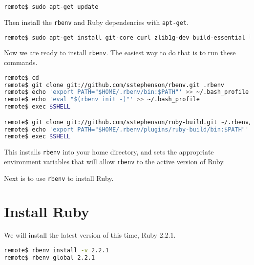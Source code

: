 \begin{minipage}{\linewidth}
\begin{lstlisting}[language=bash]
remote$ sudo apt-get update
\end{lstlisting}
\end{minipage}

Then install the \texttt{rbenv} and Ruby dependencies with \texttt{apt-get}.

\begin{minipage}{\linewidth}
\begin{lstlisting}[language=bash]
remote$ sudo apt-get install git-core curl zlib1g-dev build-essential libssl-dev libreadline-dev libyaml-dev libsqlite3-dev sqlite3 libxml2-dev libxslt1-dev libcurl4-openssl-dev python-software-properties libffi-dev
\end{lstlisting}
\end{minipage}

Now we are ready to install \texttt{rbenv}. The easiest way to do that is to run
these commands.

\begin{minipage}{\linewidth}
\begin{lstlisting}[language=bash]
remote$ cd
remote$ git clone git://github.com/sstephenson/rbenv.git .rbenv
remote$ echo 'export PATH="$HOME/.rbenv/bin:$PATH"' >> ~/.bash_profile
remote$ echo 'eval "$(rbenv init -)"' >> ~/.bash_profile
remote$ exec $SHELL

remote$ git clone git://github.com/sstephenson/ruby-build.git ~/.rbenv/plugins/ruby-build
remote$ echo 'export PATH="$HOME/.rbenv/plugins/ruby-build/bin:$PATH"' >> ~/.bash_profile
remote$ exec $SHELL
\end{lstlisting}
\end{minipage}

This installs \texttt{rbenv} into your home directory, and sets the appropriate
environment variables that will allow \texttt{rbenv} to the active version of Ruby.

Next is to use \texttt{rbenv} to install Ruby.

\section{Install Ruby}

We will install the latest version of this time, Ruby 2.2.1.

\begin{minipage}{\linewidth}
\begin{lstlisting}[language=bash]
remote$ rbenv install -v 2.2.1
remote$ rbenv global 2.2.1
\end{lstlisting}
\end{minipage}

